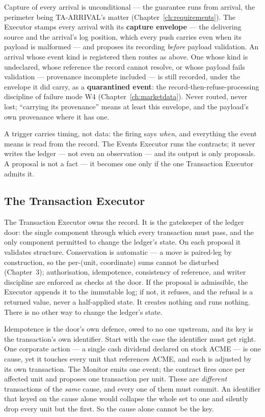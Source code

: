 \documentclass[11pt,a4paper]{article}
\begin{document}
Capture of every arrival is unconditional --- the guarantee runs from arrival, the
perimeter being TA-ARRIVAL's matter (Chapter~\ref{ch:requirements}). The Executor stamps every arrival with its
\textbf{capture envelope} --- the delivering source and the arrival's log position, which
every push carries even when its payload is malformed --- and proposes its recording
\emph{before} payload validation. An arrival whose event kind is registered then routes as
above. One whose kind is undeclared, whose reference the record cannot resolve, or whose
payload fails validation --- provenance incomplete included --- is still recorded, under
the envelope it did carry, as a \textbf{quarantined event}: the record-then-refuse-processing
discipline of failure mode W4 (Chapter~\ref{ch:marketdata}). Never routed, never lost;
``carrying its provenance'' means at least this envelope, and the payload's own provenance
where it has one.

A trigger carries timing, not data: the firing says \emph{when}, and everything
the event means is read from the record. The Events Executor runs the
contracts; it never writes the ledger --- not even an observation --- and its
output is only proposals. A proposal is not a fact --- it becomes one only if the
one Transaction Executor admits it.

\subsection{The Transaction Executor}

The Transaction Executor owns the record. It is the gatekeeper of the ledger
door: the single component through which every transaction must pass, and the
only component permitted to change the ledger's state. On each proposal it
validates structure. Conservation is automatic --- a move is paired-leg by
construction, so the per-(unit, coordinate) sums cannot be disturbed
(Chapter~3); authorisation, idempotence, consistency of reference, and writer
discipline are enforced as checks at the door. If the proposal is admissible,
the Executor appends it to the immutable log; if not, it refuses, and the
refusal is a returned value, never a half-applied state. It creates nothing and
runs nothing. There is no other way to change the ledger's state.

Idempotence is the door's own defence, owed to no one upstream, and its key is the
transaction's own identifier. Start with the case the identifier must get right. One
corporate action --- a single cash dividend declared on stock ACME --- is one cause,
yet it touches every unit that references ACME, and each is adjusted by its own
transaction. The Monitor emits one event; the contract fires once per affected unit
and proposes one transaction per unit. These are \emph{different} transactions of the
\emph{same} cause, and every one of them must commit. An identifier that keyed on the
cause alone would collapse the whole set to one and silently drop every unit but the
first. So the cause alone cannot be the key.
\end{document}
